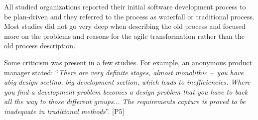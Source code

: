 All studied organizations reported their initial software development
process to be plan-driven and they referred to the process as waterfall
or traditional process. Most studies did not go very deep when
describing the old process and focused more on the problems and reasons
for the agile transformation rather than the old process description.

Some criticism was present in a few studies. For example, an anonymous
product manager stated: ``\textit{There are very definite stages, almost
monolithic – you have abig design sectino, big development section,
which leads to inefficiencies. Where you find a development problem
becomes a design problem that you have to back all the way to those
different groups... The requirements capture is proved to be inadequate
in traditional methods}''. [P5]
